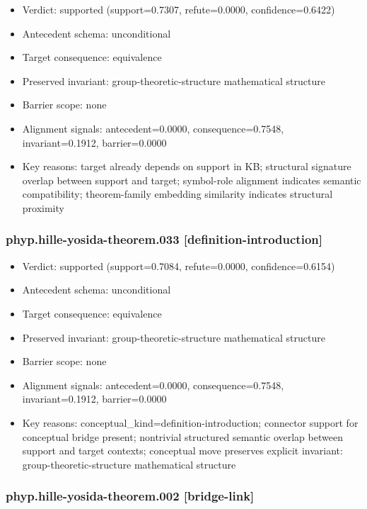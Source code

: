 \documentclass[
]{article}
\newcounter{none} %
\providecommand{\tightlist}{%
  \setlength{\itemsep}{0pt}\setlength{\parskip}{0pt}}
\begin{document}
\begin{itemize}
\tightlist
\item
  Verdict: supported (support=0.7307, refute=0.0000, confidence=0.6422)
\item
  Antecedent schema: unconditional
\item
  Target consequence: equivalence
\item
  Preserved invariant: group-theoretic-structure mathematical structure
\item
  Barrier scope: none
\item
  Alignment signals: antecedent=0.0000, consequence=0.7548,
  invariant=0.1912, barrier=0.0000
\item
  Key reasons: target already depends on support in KB; structural
  signature overlap between support and target; symbol-role alignment
  indicates semantic compatibility; theorem-family embedding similarity
  indicates structural proximity
\end{itemize}

\subsubsection{phyp.hille-yosida-theorem.033
{[}definition-introduction{]}}\label{phyphille-yosida-theorem033-definition-introduction}

\begin{itemize}
\tightlist
\item
  Verdict: supported (support=0.7084, refute=0.0000, confidence=0.6154)
\item
  Antecedent schema: unconditional
\item
  Target consequence: equivalence
\item
  Preserved invariant: group-theoretic-structure mathematical structure
\item
  Barrier scope: none
\item
  Alignment signals: antecedent=0.0000, consequence=0.7548,
  invariant=0.1912, barrier=0.0000
\item
  Key reasons: conceptual\_kind=definition-introduction; connector
  support for conceptual bridge present; nontrivial structured semantic
  overlap between support and target contexts; conceptual move preserves
  explicit invariant: group-theoretic-structure mathematical structure
\end{itemize}

\subsubsection{phyp.hille-yosida-theorem.002
{[}bridge-link{]}}\label{phyphille-yosida-theorem002-bridge-link}
\end{document}
